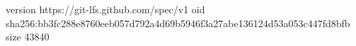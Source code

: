 version https://git-lfs.github.com/spec/v1
oid sha256:bb3fc288e8760eeb057d792a4d69b5946f3a27abe136124d53a053c447fd8bfb
size 43840

